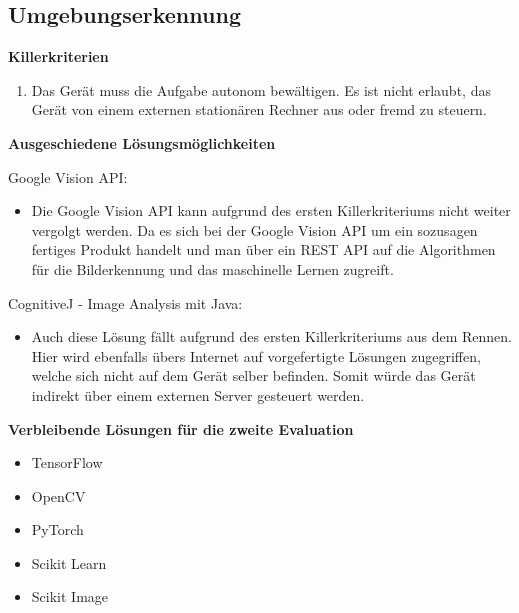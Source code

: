 \subsection{Umgebungserkennung}
\textbf{Killerkriterien}
\begin{enumerate} 
    \item Das Gerät muss die Aufgabe autonom bewältigen. Es ist nicht erlaubt, das Gerät von einem externen stationären Rechner aus oder fremd zu steuern.
\end{enumerate}

\textbf{Ausgeschiedene Lösungsmöglichkeiten}

Google Vision API:
\begin{itemize}
    \item Die Google Vision API kann aufgrund des ersten Killerkriteriums nicht weiter vergolgt werden. Da es sich bei der Google Vision API um ein sozusagen fertiges Produkt handelt und man über ein REST API auf die Algorithmen für die Bilderkennung und das maschinelle Lernen zugreift.
\end{itemize}

CognitiveJ - Image Analysis mit Java:
\begin{itemize}
    \item Auch diese Lösung fällt aufgrund des ersten Killerkriteriums aus dem Rennen. Hier wird ebenfalls übers Internet auf vorgefertigte Lösungen zugegriffen, welche sich nicht auf dem Gerät selber befinden. Somit würde das Gerät indirekt über einem externen Server gesteuert werden.
\end{itemize}

\textbf{Verbleibende Lösungen für die zweite Evaluation}
\begin{itemize}
    \item TensorFlow 
    \item OpenCV
    \item PyTorch
    \item Scikit Learn
    \item Scikit Image
\end{itemize}